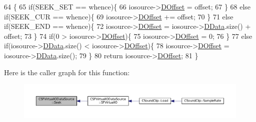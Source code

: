\begin{DoxyCode}
64                                                                                                       \{
65     \textcolor{keywordflow}{if}(SEEK\_SET == whence)\{
66         iosource->\hyperlink{classCSFVirtualIODataSource_a29db7bf8a3a7103deacb80bf619919c8}{DOffset} = offset;
67     \}
68     \textcolor{keywordflow}{else} \textcolor{keywordflow}{if}(SEEK\_CUR == whence)\{
69         iosource->\hyperlink{classCSFVirtualIODataSource_a29db7bf8a3a7103deacb80bf619919c8}{DOffset} += offset;
70     \}
71     \textcolor{keywordflow}{else} \textcolor{keywordflow}{if}(SEEK\_END == whence)\{
72         iosource->\hyperlink{classCSFVirtualIODataSource_a29db7bf8a3a7103deacb80bf619919c8}{DOffset} = iosource->\hyperlink{classCSFVirtualIODataSource_ac03be5c46b6647150e12edc04fa52ede}{DData}.size() + offset;        
73     \}
74     \textcolor{keywordflow}{if}(0 > iosource->\hyperlink{classCSFVirtualIODataSource_a29db7bf8a3a7103deacb80bf619919c8}{DOffset})\{
75         iosource->\hyperlink{classCSFVirtualIODataSource_a29db7bf8a3a7103deacb80bf619919c8}{DOffset} = 0;    
76     \}
77     \textcolor{keywordflow}{else} \textcolor{keywordflow}{if}(iosource->\hyperlink{classCSFVirtualIODataSource_ac03be5c46b6647150e12edc04fa52ede}{DData}.size() < iosource->\hyperlink{classCSFVirtualIODataSource_a29db7bf8a3a7103deacb80bf619919c8}{DOffset})\{
78         iosource->\hyperlink{classCSFVirtualIODataSource_a29db7bf8a3a7103deacb80bf619919c8}{DOffset} = iosource->\hyperlink{classCSFVirtualIODataSource_ac03be5c46b6647150e12edc04fa52ede}{DData}.size();
79     \}
80     \textcolor{keywordflow}{return} iosource->\hyperlink{classCSFVirtualIODataSource_a29db7bf8a3a7103deacb80bf619919c8}{DOffset};
81 \}
\end{DoxyCode}
Here is the caller graph for this function\+:
\nopagebreak
\begin{figure}[H]
\begin{center}
\leavevmode
\includegraphics[width=350pt]{classCSFVirtualIODataSource_a04735e135ffc05dd53fce944e772fcfc_icgraph}
\end{center}
\end{figure}
\hypertarget{classCSFVirtualIODataSource_a9c15fbbe734fdfc2af17ca8f424b7e43}{}\label{classCSFVirtualIODataSource_a9c15fbbe734fdfc2af17ca8f424b7e43} 
